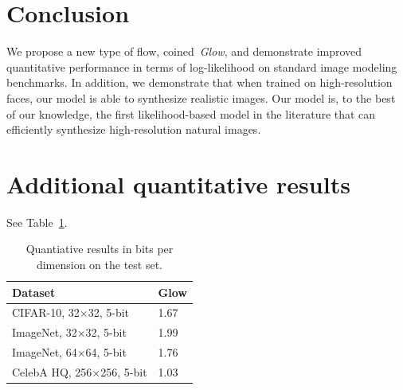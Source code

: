\documentclass{article}
\begin{document}

\section{Conclusion}

We propose a new type of flow, coined~\emph{Glow}, and demonstrate improved quantitative performance in terms of log-likelihood on standard image modeling benchmarks. In addition, we demonstrate that when trained on high-resolution faces, our model is able to synthesize realistic images. Our model is, to the best of our knowledge, the first likelihood-based model in the literature that can efficiently synthesize high-resolution natural images.

\smaller





\appendix
\normalsize

\section{Additional quantitative results}
See Table~\ref{tab:models:moreresults}.
\begin{table}[h]
    \centering
    \caption{Quantiative results in bits per dimension on the test set.}
    \label{tab:models:moreresults}
    \begin{tabular}{l | l}
    \toprule
    Dataset & Glow
    \\\midrule
    CIFAR-10, 32$\times$32, 5-bit & 1.67
    \\\midrule
    ImageNet, 32$\times$32, 5-bit & 1.99
    \\\midrule
    ImageNet, 64$\times$64, 5-bit & 1.76
    \\\midrule
    CelebA HQ, 256$\times$256, 5-bit & 1.03
    \\\bottomrule
    \end{tabular}
\end{table}
\end{document}
